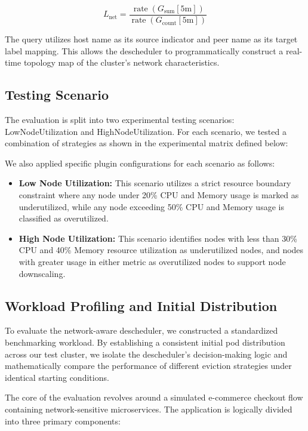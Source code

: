 \[
L_{\text{net}}
=
\frac{\operatorname{rate}(G_{\text{sum}}[5\text{m}])}
{\operatorname{rate}(G_{\text{count}}[5\text{m}])}
\]

The query utilizes host name as its source indicator and peer name as its target label mapping. This allows the descheduler to programmatically construct a real-time topology map of the cluster's network characteristics.


\subsection{Testing Scenario}
\label{subsec:netaware4_experimentalmatrix}

The evaluation is split into two experimental testing scenarios: LowNodeUtilization and HighNodeUtilization. For each scenario, we tested a combination of strategies as shown in the experimental matrix defined below:


We also applied specific plugin configurations for each scenario as follows:

\begin{itemize}
    \item \textbf{Low Node Utilization:} This scenario utilizes a strict resource boundary constraint where any node under 20\% CPU and Memory usage is marked as underutilized, while any node exceeding 50\% CPU and Memory usage is classified as overutilized.

    \item \textbf{High Node Utilization:} This scenario identifies nodes with less than 30\% CPU and 40\% Memory resource utilization as underutilized nodes, and nodes with greater usage in either metric as overutilized nodes to support node downscaling.
\end{itemize}
\subsection{Workload Profiling and Initial Distribution}
\label{subsec:netaware4_workloadprofiling}




To evaluate the network-aware descheduler, we constructed a standardized benchmarking workload. By establishing a consistent initial pod distribution across our test cluster, we isolate the descheduler's decision-making logic and mathematically compare the performance of different eviction strategies under identical starting conditions.

The core of the evaluation revolves around a simulated e-commerce checkout flow containing network-sensitive microservices. The application is logically divided into three primary components:

